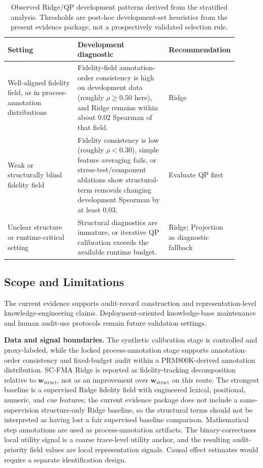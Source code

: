 \documentclass[a4paper,fleqn]{cas-sc}
\newcommand{\wstruct}{\ensuremath{\mathbf{w}_{\mathrm{struct}}}}
\begin{document}
\begin{table}[ht]
\caption{Observed Ridge/QP development patterns derived from the stratified analysis. Thresholds are post-hoc development-set heuristics from the present evidence package, not a prospectively validated selection rule.}
\label{tab:variant-policy}
\centering
\small
\renewcommand{\arraystretch}{1.08}
\begin{tabular}{Z{0.32\linewidth}Z{0.42\linewidth}Z{0.16\linewidth}}
\toprule
\textbf{Setting} & \textbf{Development diagnostic} & \textbf{Recommendation} \\
\midrule
Well-aligned fidelity field, as in process-annotation distributions & Fidelity-field annotation-order consistency is high on development data (roughly $\rho \ge 0.50$ here), and Ridge remains within about 0.02 Spearman of that field. & Ridge \\
Weak or structurally blind fidelity field & Fidelity consistency is low (roughly $\rho < 0.30$), simple feature averaging fails, or stress-test/component ablations show structural-term removals changing development Spearman by at least 0.03. & Evaluate QP first \\
Unclear structure or runtime-critical setting & Structural diagnostics are immature, or iterative QP calibration exceeds the available runtime budget. & Ridge; Projection as diagnostic fallback \\
\bottomrule
\end{tabular}
\end{table}

\subsection{Scope and Limitations}
\label{sec:scope-limitations}

\medskip
\noindent The current evidence supports audit-record construction and representation-level knowledge-engineering claims. Deployment-oriented knowledge-base maintenance and human audit-use protocols remain future validation settings.

\medskip
\noindent\textbf{Data and signal boundaries.} The synthetic calibration stage is controlled and proxy-labeled, while the locked process-annotation stage supports annotation-order consistency and fixed-budget audit within a PRM800K-derived annotation distribution. SC-FMA Ridge is reported as fidelity-tracking decomposition relative to \wstruct{}, not as an improvement over \wstruct{} on this route. The strongest baseline is a supervised Ridge fidelity field with engineered lexical, positional, numeric, and cue features; the current evidence package does not include a same-supervision structure-only Ridge baseline, so the structural terms should not be interpreted as having lost a fair supervised baseline comparison. Mathematical step annotations are used as process-annotation artifacts. The binary-correctness local utility signal is a coarse trace-level utility anchor, and the resulting audit-priority field values are local representation signals. Causal effect estimates would require a separate identification design.
\end{document}
